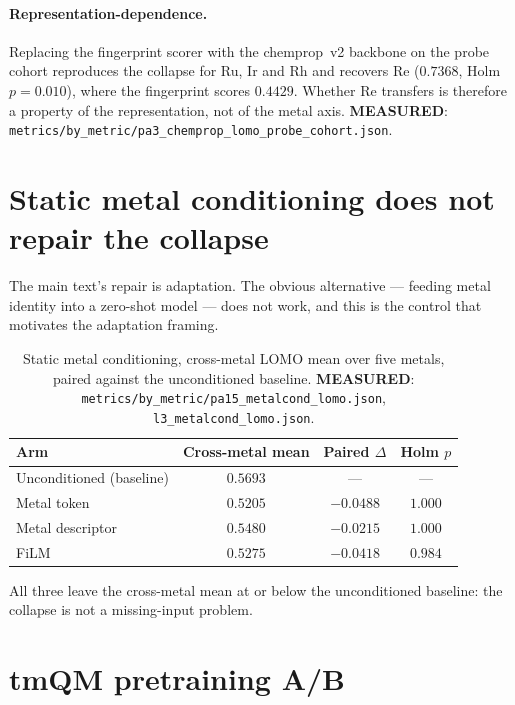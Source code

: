 \documentclass[11pt]{article}
\newcommand{\MEASURED}{\textbf{MEASURED}}
\begin{document}
\paragraph{Representation-dependence.} Replacing the fingerprint scorer with the
chemprop~v2 backbone on the probe cohort reproduces the collapse for Ru, Ir and
Rh and recovers Re ($0.7368$, Holm $p=0.010$), where the fingerprint scores
$0.4429$. Whether Re transfers is therefore a property of the representation,
not of the metal axis. \MEASURED:
\texttt{metrics/by\_metric/pa3\_chemprop\_lomo\_probe\_cohort.json}.

\section{Static metal conditioning does not repair the collapse}
\label{sec:si:metalcond}

The main text's repair is adaptation. The obvious alternative --- feeding metal
identity into a zero-shot model --- does not work, and this is the control that
motivates the adaptation framing.

\begin{table}[h]
\centering
\caption{Static metal conditioning, cross-metal LOMO mean over five metals,
paired against the unconditioned baseline. \MEASURED:
\texttt{metrics/by\_metric/pa15\_metalcond\_lomo.json},
\texttt{l3\_metalcond\_lomo.json}.}
\begin{tabular}{lccc}
\toprule
Arm & Cross-metal mean & Paired $\Delta$ & Holm $p$ \\
\midrule
Unconditioned (baseline) & $0.5693$ & --- & --- \\
Metal token              & $0.5205$ & $-0.0488$ & $1.000$ \\
Metal descriptor         & $0.5480$ & $-0.0215$ & $1.000$ \\
FiLM                     & $0.5275$ & $-0.0418$ & $0.984$ \\
\bottomrule
\end{tabular}
\end{table}

All three leave the cross-metal mean at or below the unconditioned baseline:
the collapse is not a missing-input problem.

\section{tmQM pretraining A/B}
\label{sec:si:pretrain}
\end{document}
